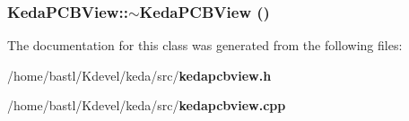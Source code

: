 \subsubsection{\setlength{\rightskip}{0pt plus 5cm}Keda\-PCBView::$\sim$Keda\-PCBView ()\hspace{0.3cm}{\tt  [virtual]}}\label{classKedaPCBView_bb1a9395b3c7b47cda4658a55d6d903e}




The documentation for this class was generated from the following files:\begin{CompactItemize}
\item 
/home/bastl/Kdevel/keda/src/{\bf kedapcbview.h}\item 
/home/bastl/Kdevel/keda/src/{\bf kedapcbview.cpp}\end{CompactItemize}
